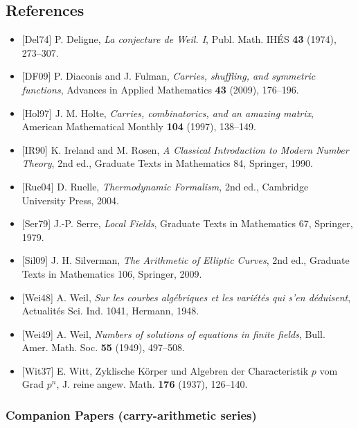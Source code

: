 \documentclass[
  11pt,
]{article}
\providecommand{\tightlist}{%
  \setlength{\itemsep}{0pt}\setlength{\parskip}{0pt}}
\begin{document}
\newpage

\subsection{References}\label{references}

\begin{itemize}
\tightlist
\item
  {[}Del74{]} P. Deligne, \emph{La conjecture de Weil. I}, Publ. Math. IHÉS
  \textbf{43} (1974), 273--307.
\item
  {[}DF09{]} P. Diaconis and J. Fulman, \emph{Carries, shuffling, and symmetric
  functions}, Advances in Applied Mathematics \textbf{43} (2009), 176--196.
\item
  {[}Hol97{]} J. M. Holte, \emph{Carries, combinatorics, and an amazing matrix},
  American Mathematical Monthly \textbf{104} (1997), 138--149.
\item
  {[}IR90{]} K. Ireland and M. Rosen, \emph{A Classical Introduction to Modern
  Number Theory}, 2nd ed., Graduate Texts in Mathematics 84, Springer, 1990.
\item
  {[}Rue04{]} D. Ruelle, \emph{Thermodynamic Formalism}, 2nd ed., Cambridge
  University Press, 2004.
\item
  {[}Ser79{]} J.-P. Serre, \emph{Local Fields}, Graduate Texts in Mathematics
  67, Springer, 1979.
\item
  {[}Sil09{]} J. H. Silverman, \emph{The Arithmetic of Elliptic Curves}, 2nd
  ed., Graduate Texts in Mathematics 106, Springer, 2009.
\item
  {[}Wei48{]} A. Weil, \emph{Sur les courbes algébriques et les variétés qui
  s'en déduisent}, Actualités Sci. Ind. 1041, Hermann, 1948.
\item
  {[}Wei49{]} A. Weil, \emph{Numbers of solutions of equations in finite
  fields}, Bull. Amer. Math. Soc. \textbf{55} (1949), 497--508.
\item
  {[}Wit37{]} E. Witt, Zyklische Körper und Algebren der Characteristik \(p\)
  vom Grad \(p^n\), J. reine angew. Math. \textbf{176} (1937), 126--140.
\end{itemize}

\subsubsection{Companion Papers (carry-arithmetic
series)}\label{companion-papers-carry-arithmetic-series}
\end{document}
